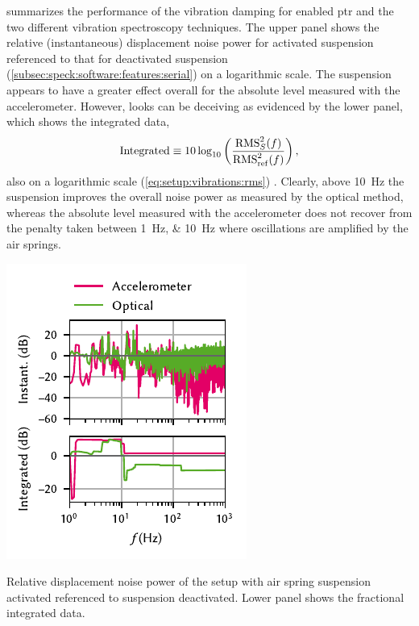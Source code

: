  summarizes the performance of the vibration damping for enabled \gls{ptr} and the two different vibration spectroscopy techniques.
The upper panel shows the relative (instantaneous) displacement noise power for activated suspension referenced to that for deactivated suspension (\cf \cref{subsec:speck:software:features:serial}) on a logarithmic scale.
The suspension appears to have a greater effect overall for the absolute level measured with the accelerometer.
However, looks can be deceiving as evidenced by the lower panel, which shows the integrated data,
\begin{equation}
    \mathrm{Integrated} \equiv 10\log_{10}\left(\frac{\operatorname{RMS}_{S}^2(f)}{\operatorname{RMS}_{\mathrm{ref}}^2(f)}\right),
\end{equation}
also on a logarithmic scale (\cf \cref{eq:setup:vibrations:rms}) .
Clearly, above \qty{10}{\hertz} the suspension improves the overall noise power as measured by the optical method, whereas the absolute level measured with the accelerometer does not recover from the penalty taken between \qtylist{1;10}{\hertz} where oscillations are amplified by the air springs.

\begin{marginfigure}[*-15]
    \centering
    \includegraphics{img/pdf/setup/spect_dB}
    \caption[]{
        Relative displacement noise power of the setup with air spring suspension activated referenced to suspension deactivated.
        Lower panel shows the fractional integrated data.
    }
    \label{fig:setup:conclusion:vibrations}
\end{marginfigure}


